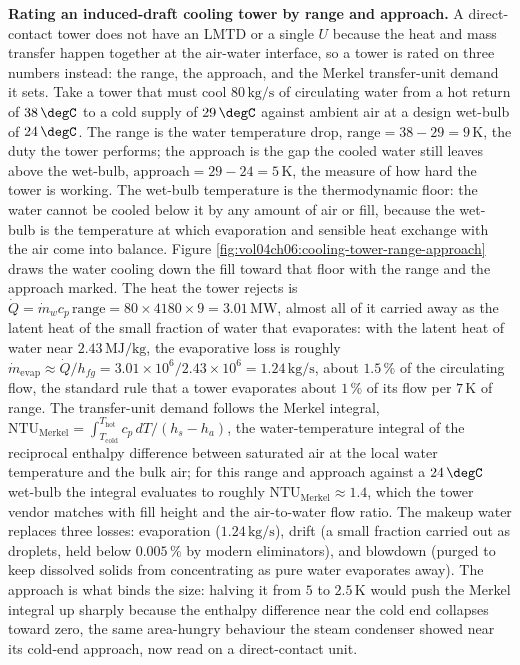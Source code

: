\textbf{Rating an induced-draft cooling tower by range and approach.} A
direct-contact tower does not have an LMTD or a single $U$ because the heat and
mass transfer happen together at the air-water interface, so a tower is rated on
three numbers instead: the range, the approach, and the Merkel transfer-unit
demand it sets. Take a tower that must cool $80\,\text{kg/s}$ of circulating
water from a hot return of $38\,\degC$ to a cold supply of $29\,\degC$ against
ambient air at a design wet-bulb of $24\,\degC$. The range is the water
temperature drop, $\text{range} = 38 - 29 = 9\,\si{\kelvin}$, the duty the tower
performs; the approach is the gap the cooled water still leaves above the
wet-bulb, $\text{approach} = 29 - 24 = 5\,\si{\kelvin}$, the measure of how hard
the tower is working. The wet-bulb temperature is the thermodynamic floor: the
water cannot be cooled below it by any amount of air or fill, because the
wet-bulb is the temperature at which evaporation and sensible heat exchange with
the air come into balance. Figure
\ref{fig:vol04ch06:cooling-tower-range-approach} draws the water cooling down the
fill toward that floor with the range and the approach marked. The heat the
tower rejects is $\dot{Q} = \dot{m}_w c_p\,\text{range} = 80\times 4180\times 9 =
3.01\,\text{MW}$, almost all of it carried away as the latent heat of the small
fraction of water that evaporates: with the latent heat of water near $2.43\,
\text{MJ/kg}$, the evaporative loss is roughly $\dot{m}_{\text{evap}} \approx
\dot{Q}/h_{fg} = 3.01\times 10^6/2.43\times 10^6 = 1.24\,\text{kg/s}$, about
$1.5\,\%$ of the circulating flow, the standard rule that a tower evaporates
about $1\,\%$ of its flow per $7\,\si{\kelvin}$ of range. The transfer-unit
demand follows the Merkel integral, $\text{NTU}_{\text{Merkel}} = \int_{T_{\text{
cold}}}^{T_{\text{hot}}} c_p\,dT/(h_{s} - h_{a})$, the water-temperature integral
of the reciprocal enthalpy difference between saturated air at the local water
temperature and the bulk air; for this range and approach against a $24\,\degC$
wet-bulb the integral evaluates to roughly $\text{NTU}_{\text{Merkel}} \approx
1.4$, which the tower vendor matches with fill height and the air-to-water flow
ratio. The makeup water replaces three losses: evaporation ($1.24\,\text{kg/s}$),
drift (a small fraction carried out as droplets, held below $0.005\,\%$ by
modern eliminators), and blowdown (purged to keep dissolved solids from
concentrating as pure water evaporates away). The approach is what binds the
size: halving it from $5$ to $2.5\,\si{\kelvin}$ would push the Merkel integral
up sharply because the enthalpy difference near the cold end collapses toward
zero, the same area-hungry behaviour the steam condenser showed near its cold-end
approach, now read on a direct-contact unit.

